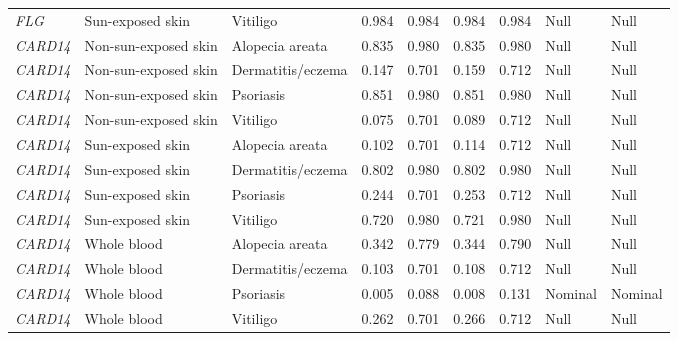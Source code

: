 \documentclass[10pt,a4paper]{article}
\begin{document}
\begin{landscape}
\begin{longtable}{p{1.7cm}p{3.2cm}p{2.8cm}p{2.2cm}p{2.2cm}p{2.2cm}p{2.2cm}p{3.0cm}p{3.0cm}}
\textit{FLG} & Sun-exposed skin & Vitiligo & 0.984 & 0.984 & 0.984 & 0.984 & Null & Null \\
\textit{CARD14} & Non-sun-exposed skin & Alopecia areata & 0.835 & 0.980 & 0.835 & 0.980 & Null & Null \\
\textit{CARD14} & Non-sun-exposed skin & Dermatitis/eczema & 0.147 & 0.701 & 0.159 & 0.712 & Null & Null \\
\textit{CARD14} & Non-sun-exposed skin & Psoriasis & 0.851 & 0.980 & 0.851 & 0.980 & Null & Null \\
\textit{CARD14} & Non-sun-exposed skin & Vitiligo & 0.075 & 0.701 & 0.089 & 0.712 & Null & Null \\
\textit{CARD14} & Sun-exposed skin & Alopecia areata & 0.102 & 0.701 & 0.114 & 0.712 & Null & Null \\
\textit{CARD14} & Sun-exposed skin & Dermatitis/eczema & 0.802 & 0.980 & 0.802 & 0.980 & Null & Null \\
\textit{CARD14} & Sun-exposed skin & Psoriasis & 0.244 & 0.701 & 0.253 & 0.712 & Null & Null \\
\textit{CARD14} & Sun-exposed skin & Vitiligo & 0.720 & 0.980 & 0.721 & 0.980 & Null & Null \\
\textit{CARD14} & Whole blood & Alopecia areata & 0.342 & 0.779 & 0.344 & 0.790 & Null & Null \\
\textit{CARD14} & Whole blood & Dermatitis/eczema & 0.103 & 0.701 & 0.108 & 0.712 & Null & Null \\
\textit{CARD14} & Whole blood & Psoriasis & 0.005 & 0.088 & 0.008 & 0.131 & Nominal & Nominal \\
\textit{CARD14} & Whole blood & Vitiligo & 0.262 & 0.701 & 0.266 & 0.712 & Null & Null \\
\end{longtable}
\end{landscape}
\end{document}
